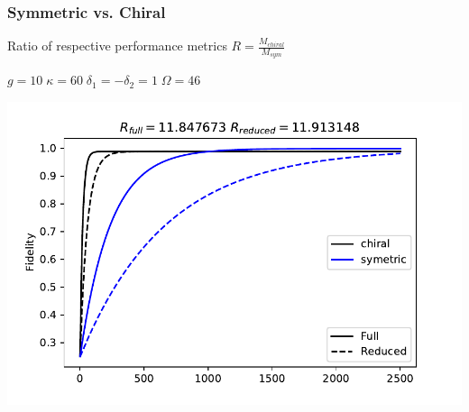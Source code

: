 \documentclass{beamer}
\begin{document}
\begin{frame}
\frametitle{Symmetric vs. Chiral}
\centering 
Ratio of respective performance metrics $R = \frac{M_{chiral}}{M_{sym}}$

\vspace{3mm}

$g = 10 \; \kappa = 60 \; \delta_1 = - \delta_2 = 1 \; \Omega=46$

\includegraphics[scale=.6]{Sym_v_Chiral.pdf}

\end{frame}
\end{document}
